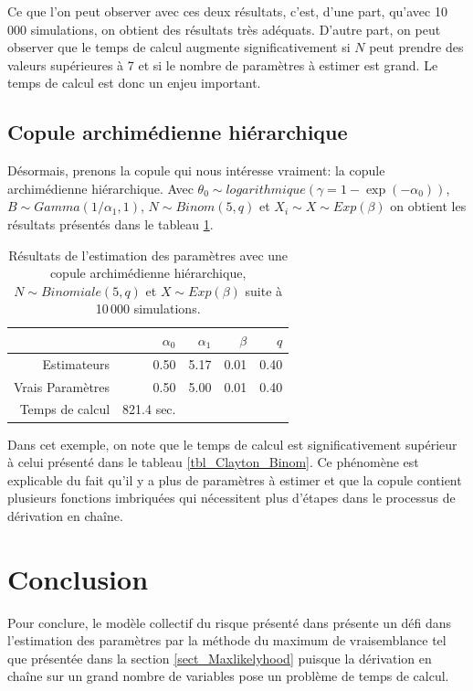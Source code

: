 \documentclass{article}
\begin{document}
		
	Ce que l'on peut observer avec ces deux résultats, c'est, d'une part, qu'avec 10\,000 simulations, on obtient des résultats très adéquats. D'autre part, on peut observer que le temps de calcul augmente significativement si $N$ peut prendre des valeurs supérieures à 7 et si le nombre de paramètres à estimer est grand. Le temps de calcul est donc un enjeu important.

	\subsection{Copule archimédienne hiérarchique}
	Désormais, prenons la copule qui nous intéresse vraiment: la copule archimédienne hiérarchique. Avec $\theta_0 \sim logarithmique\left(\gamma = 1-\exp(-\alpha_0)\right)$, $B \sim Gamma(1/\alpha_1, 1)$, $N \sim Binom(5,q)$ et $X_i \sim X \sim Exp(\beta)$ on obtient les résultats présentés dans le tableau \ref{tbl_archi_hierar}.
	\begin{table}[H]
		\centering
		\begin{tabular}{rrrrr}
			\hline
			& $\alpha_{0}$ & $\alpha_{1}$ & $\beta$ & $q$ \\ 
			\hline
			Estimateurs & 0.50 & 5.17 & 0.01 & 0.40 \\ 
			Vrais Paramètres & 0.50 & 5.00 & 0.01 & 0.40 \\ 
			\hline
			Temps de calcul & 821.4 sec. \\
			\hline
		\end{tabular}
		\caption[Estimations avec une copule archimédienne hiérarchique et $N\sim Binomiale$]{Résultats de l'estimation des paramètres avec une copule archimédienne hiérarchique, $N \sim Binomiale(5, q)$ et $X \sim Exp(\beta)$ suite à 10\,000 simulations.} \label{tbl_archi_hierar}
	\end{table}

	Dans cet exemple, on note que le temps de calcul est significativement supérieur à celui présenté dans le tableau \ref{tbl_Clayton_Binom}. Ce phénomène est explicable du fait qu'il y a plus de paramètres à estimer et que la copule contient plusieurs fonctions imbriquées qui nécessitent plus d'étapes dans le processus de dérivation en chaîne.
	
	\section{Conclusion}
	Pour conclure, le modèle collectif du risque présenté dans \cite{Itre5} présente un défi dans l'estimation des paramètres par la méthode du maximum de vraisemblance tel que présentée dans la section \ref{sect_Maxlikelyhood} puisque la dérivation en chaîne sur un grand nombre de variables pose un problème de temps de calcul.\\
	
\end{document}

